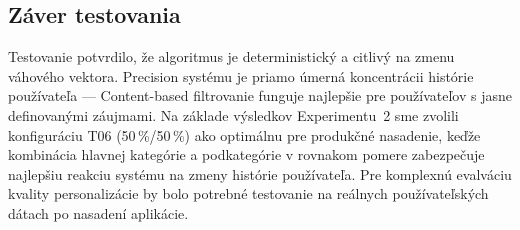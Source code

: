\subsection{Záver testovania}

Testovanie potvrdilo, že algoritmus je deterministický a citlivý na zmenu váhového
vektora. Precision systému je priamo úmerná koncentrácii histórie používateľa —
Content-based filtrovanie funguje najlepšie pre používateľov s jasne definovanými
záujmami. Na základe výsledkov Experimentu~2 sme zvolili konfiguráciu T06
(50\,\%/50\,\%) ako optimálnu pre produkčné nasadenie, keďže kombinácia hlavnej
kategórie a podkategórie v rovnakom pomere zabezpečuje najlepšiu reakciu systému
na zmeny histórie používateľa. Pre komplexnú evalváciu kvality personalizácie by
bolo potrebné testovanie na reálnych používateľských dátach po nasadení aplikácie.
